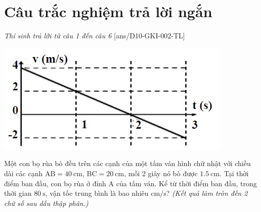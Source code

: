 \section{Câu trắc nghiệm trả lời ngắn} \textit{Thí sinh trả lời từ câu 1 đến câu 6}
\setcounter{ex}{0}
[ans/D10-GKI-002-TL]
\begin{ex}
	{\vspace{-0.5cm}\includegraphics[scale=0.7]{../figs/D10-2-13}}
	\loigiai{
		
	}
\end{ex}
\begin{ex}
	Một con bọ rùa bò đều trên các cạnh của một tấm ván hình chữ nhật với chiều dài các cạnh $\mathrm{AB}=\SI{40}{\centi\meter}$, $\mathrm{BC}=\SI{20}{\centi\meter}$, mỗi 2 giây nó bò được $\SI{1.5}{\centi\meter}$. Tại thời điểm ban đầu, con bọ rùa ở đỉnh A của tấm ván. Kể từ thời điểm ban đầu, trong thời gian $\SI{80}{\second}$, vận tốc trung bình là bao nhiêu $\si{\centi\meter/\second}$? \textit{(Kết quả làm tròn đến 2 chữ số sau dấu thập phân.)}
\end{ex}
